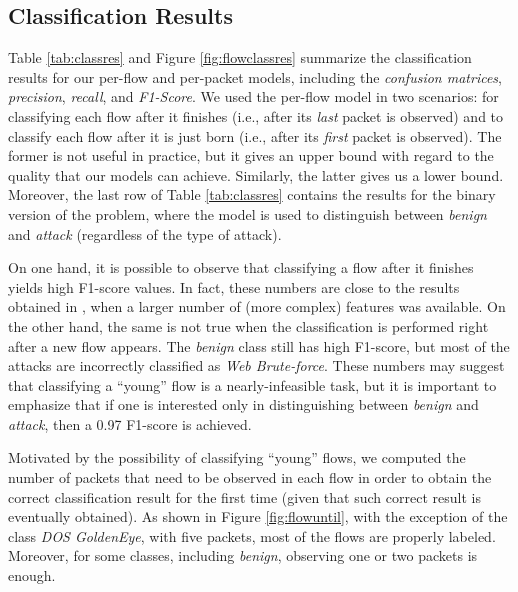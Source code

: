 \subsection{Classification Results}\label{sub:classres}




Table \ref{tab:classres} and Figure \ref{fig:flowclassres} summarize the classification results for our per-flow and per-packet models, including the \emph{confusion matrices}, \emph{precision}, \emph{recall}, and \emph{F1-Score}.
We used the per-flow model in two scenarios: for classifying each flow after it finishes (i.e., after its \emph{last} packet is observed) and to classify each flow after it is just born (i.e., after its \emph{first} packet is observed). The former is not useful in practice, but it gives an upper bound with regard to the quality that our models can achieve. Similarly, the latter gives us a lower bound.
Moreover, the last row of Table \ref{tab:classres} contains the results for the binary version of the problem, where the model is used to distinguish between \emph{benign} and \emph{attack} (regardless of the type of attack).


On one hand, it is possible to observe that classifying a flow after it finishes yields high F1-score values. In fact, these numbers are close to the results obtained in \cite{sharafaldin2018toward}, when a larger number of (more complex) features was available. On the other hand, the same is not true when the classification is performed right after a new flow appears. The \emph{benign} class still has high F1-score, but most of the attacks are incorrectly classified as \emph{Web Brute-force}. These numbers may suggest that classifying a 
``young'' flow is a nearly-infeasible task, but it is important to emphasize that if one is interested only in distinguishing between \emph{benign} and \emph{attack}, then a 0.97 F1-score is achieved.

Motivated by the possibility of classifying ``young'' flows, we computed the number of packets that need to be observed in each flow in order to obtain the correct classification result for the first time (given that such correct result is eventually obtained). As shown in Figure \ref{fig:flowuntil}, with the exception of the class \emph{DOS GoldenEye}, with five packets, most of the flows are properly labeled. Moreover, for some classes, including \emph{benign}, observing one or two packets is enough.

